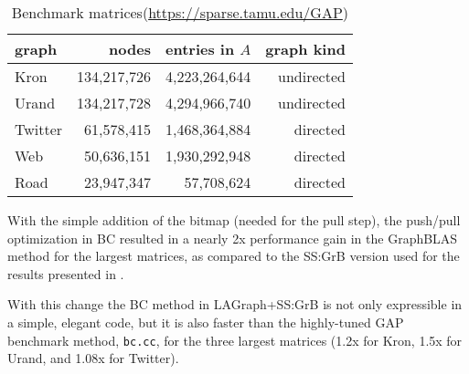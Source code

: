 \begin{table}
\begin{center}
\begin{tabular}{|l|rrr|}
\hline
graph   & nodes        & entries in $A$ & graph kind \\
\hline
Kron    & 134,217,726 &  4,223,264,644 &  undirected   \\
Urand   & 134,217,728 &  4,294,966,740 &  undirected   \\
Twitter &  61,578,415 &  1,468,364,884 &  directed     \\
Web     &  50,636,151 &  1,930,292,948 &  directed     \\
Road    &  23,947,347 &     57,708,624 &  directed     \\
\hline
\end{tabular}
\caption{Benchmark matrices\label{table:matrices}
(\url{https://sparse.tamu.edu/GAP})}
\end{center}
\end{table}


With the simple addition of the bitmap (needed for the pull step), the
push/pull optimization in BC resulted in a nearly 2x performance gain in the
GraphBLAS method for the largest matrices, as compared to the SS:GrB version
used for the results presented in \cite{DBLP:conf/iiswc/AzadABBCDDDDFGG20}.

With this change the BC method in LAGraph+SS:GrB is not only expressible in a
simple, elegant code, but it is also faster than the highly-tuned GAP benchmark
method, \verb'bc.cc', for the three largest matrices (1.2x for Kron, 1.5x for
Urand, and 1.08x for Twitter).




